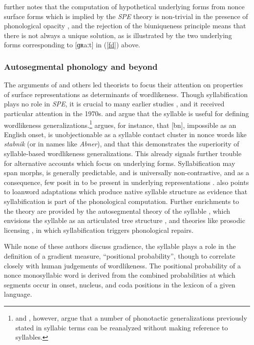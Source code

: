 \citet{Sommerstein1974} further notes that the computation of hypothetical underlying forms from nonce surface forms which is implied by the \emph{SPE} theory is non-trivial in the presence of phonological opacity \citep[see][528f.]{Anderson1988a}, and the rejection of the biuniqueness principle means that there is not always a unique solution, as is illustrated by the two underlying forms corresponding to [ɡʀaːt] in (\ref{fd}) above.

\subsubsection{Autosegmental phonology and beyond}

The arguments of \citeauthor{Shibatani1973} and others led theorists to focus their attention on properties of surface representations as determinants of wordlikeness. Though syllabification plays no role in \emph{SPE}, it is crucial to many earlier studies \citep[for a review, see][]{Goldsmith2011b}, and it received particular attention in the 1970s. \citet{Hooper1973} and \citet{Kahn1976} argue that the syllable is useful for defining wordlikeness generalizations.\footnote{\citet{Steriade1999} and \citet{Blevins2003}, however, argue that a number of phonotactic generalizations previously stated in syllabic terms can be reanalyzed without making reference to syllables.} \citeauthor{Hooper1973} argues, for instance, that [bn], impossible as an English onset, is unobjectionable as a syllable contact cluster in nonce words like \emph{stabnik} (or in names like \emph{Abner}), and that this demonstrates the superiority of syllable-based wordlikeness generalizations. This already signals further trouble for alternative accounts which focus on underlying forms. Syllabification may span morphs, is generally predictable, and is universally non-contrastive, and as a consequence, few posit in to be present in underlying representations \citep[though see, e.g.,][]{Vaux2003}. \citeauthor{Hooper1973} also points to loanword adaptations which produce native syllable structure \citep[e.g.,][]{Carlisle1991} as evidence that syllabification is part of the phonological computation. Further enrichments to the theory are provided by the autosegmental theory of the syllable \citep{McCarthy1979b}, which envisions the syllable as an articulated tree structure \citep[as first envisioned by][]{Pike1947a}, and theories like prosodic licensing \citep{Ito1989a}, in which syllabification triggers phonological repairs.

While none of these authors discuss gradience, the syllable plays a role in the definition of a gradient measure, ``positional probability'', though to correlate closely with human judgements of wordlikeness. The positional probability of a nonce monosyllabic word is derived from the combined probabilities at which segments occur in onset, nucleus, and coda positions in the lexicon of a given language. 

